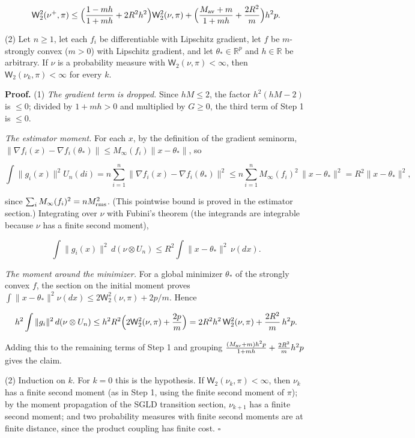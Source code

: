 \documentclass[11pt,a4paper]{report}
\begin{document}
\[\mathsf W_2^2(\nu^+,\pi)\le\Bigl(\frac{1-mh}{1+mh}+2R^2h^2\Bigr)\mathsf W_2^2(\nu,\pi)+\Bigl(\frac{M_{\rm av}+m}{1+mh}+\frac{2R^2}m\Bigr)h^2p.\]


(2) Let \(n\ge1\), let each \(f_i\) be differentiable with Lipschitz gradient, let \(f\) be \(m\)-strongly convex (\(m>0\)) with Lipschitz gradient, and let \(\theta_*\in\mathbb R^p\) and \(h\in\mathbb R\) be arbitrary. If \(\nu\) is a probability measure with \(\mathsf W_2(\nu,\pi)<\infty\), then \(\mathsf W_2(\nu_k,\pi)<\infty\) for every \(k\).




\textbf{Proof.} (1) \emph{The gradient term is dropped.} Since \(hM\le2\), the factor \(h^2(hM-2)\) is \(\le0\); divided by \(1+mh>0\) and multiplied by \(G\ge0\), the third term of Step 1 is \(\le0\).




\emph{The estimator moment.} For each \(x\), by the definition of the gradient seminorm, \(\|\nabla f_i(x)-\nabla f_i(\theta_*)\|\le M_\infty(f_i)\|x-\theta_*\|\), so


\[\int\|g_i(x)\|^2U_n(di)=n\sum_{i=1}^n\|\nabla f_i(x)-\nabla f_i(\theta_*)\|^2\le n\sum_{i=1}^nM_\infty(f_i)^2\,\|x-\theta_*\|^2=R^2\|x-\theta_*\|^2,\]


since \(\sum_iM_\infty(f_i)^2=nM_{\rm rms}^2\). (This pointwise bound is proved in the estimator section.) Integrating over \(\nu\) with Fubini's theorem (the integrands are integrable because \(\nu\) has a finite second moment),


\[\int\|g_i(x)\|^2\,d(\nu\otimes U_n)\le R^2\int\|x-\theta_*\|^2\,\nu(dx).\]


\emph{The moment around the minimizer.} For a global minimizer \(\theta_*\) of the strongly convex \(f\), the section on the initial moment proves \(\int\|x-\theta_*\|^2\nu(dx)\le2\mathsf W_2^2(\nu,\pi)+2p/m\). Hence


\[h^2\int\|g_i\|^2\,d(\nu\otimes U_n)\le h^2R^2\Bigl(2\mathsf W_2^2(\nu,\pi)+\frac{2p}m\Bigr)=2R^2h^2\,\mathsf W_2^2(\nu,\pi)+\frac{2R^2}m\,h^2p.\]


Adding this to the remaining terms of Step 1 and grouping \(\frac{(M_{\rm av}+m)h^2p}{1+mh}+\frac{2R^2}mh^2p\) gives the claim.




(2) Induction on \(k\). For \(k=0\) this is the hypothesis. If \(\mathsf W_2(\nu_k,\pi)<\infty\), then \(\nu_k\) has a finite second moment (as in Step 1, using the finite second moment of \(\pi\)); by the moment propagation of the SGLD transition section, \(\nu_{k+1}\) has a finite second moment; and two probability measures with finite second moments are at finite distance, since the product coupling has finite cost. \(\square\)
\end{document}
